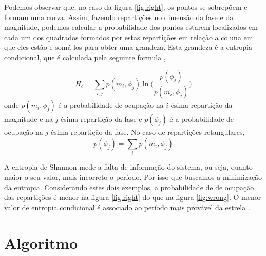 \begin{comment}
Quando uma série temporal é dividida pelo período correto, será gerado uma dispersão com característica oscilante, como é o caso da figura \ref{fig:right}. Se o período utilizado na transforma\c{c}ão não for o correto, será gerado uma dispersão aleatória, sem forma definida, como mostra a figura \ref{fig:wrong}. 

\end{comment}

Podemos observar que, no caso da figura \ref{fig:right}, os pontos se sobrepõem e formam uma curva. Assim, fazendo reparti\c{c}ões no dimensão da fase e da magnitude, podemos calcular a probabilidade dos pontos estarem localizados em cada um dos quadrados formados por estas reparti\c{c}ões em rela\c{c}ão a coluna em que eles estão e somá-los para obter uma grandeza. Esta grandeza é a entropia condicional, que é calculada pela seguinte formula \citep{ce},

\begin{equation}
H_c = \sum_{i,j} p(m_i,\phi_j)\ln \Big(\frac{p(\phi_j)}{p(m_i,\phi_j)}\Big)
\end{equation}
onde $p(m_i,\phi_j)$ é a probabilidade de ocupa\c{c}ão na $i$-ésima reparti\c{c}ão da magnitude e na $j$-ésima reparti\c{c}ão da fase e $p(\phi_j)$ é a probabilidade de ocupa\c{c}ão na $j$-ésima reparti\c{c}ão da fase. No caso de reparti\c{c}ões retangulares, %
\begin{equation}
p(\phi_j) = \sum_i p(m_i,\phi_j)
\end{equation}

A entropia de Shannon mede a falta de informa\c{c}ão do sistema, ou seja, quanto maior o seu valor, mais incorreto o período. Por isso que buscamos a minimiza\c{c}ão da entropia.
Considerando estes dois exemplos, a probabilidade de de ocupa\c{c}ão das reparti\c{c}ões é menor na figura \ref{fig:right} do que na figura \ref{fig:wrong}. O menor valor de entropia condicional é associado ao período mais provável da estrela \citep{ce}. 

\section{Algoritmo}


